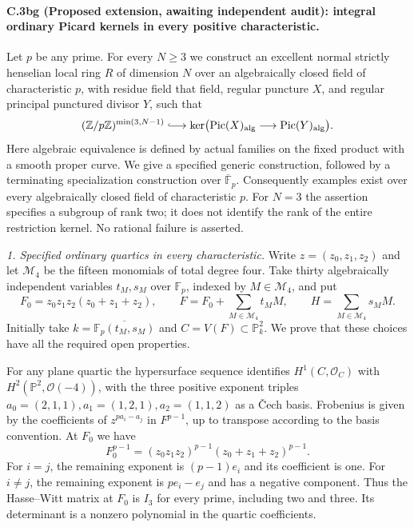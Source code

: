 \paragraph{C.3bg (Proposed extension, awaiting independent audit): integral ordinary Picard kernels in every positive characteristic.}
Let $p$ be any prime. For every $N\ge3$ we construct an excellent
normal strictly henselian local ring $R$ of dimension $N$ over an
algebraically closed field of characteristic $p$, with residue field
that field, regular puncture $X$, and regular principal punctured
divisor $Y$, such that
\[
 (\mathbb Z/p\mathbb Z)^{\min(3,N-1)}
 \lhook\joinrel\longrightarrow
 \ker\bigl(\operatorname{Pic}(X)_{\rm alg}
             \longrightarrow\operatorname{Pic}(Y)_{\rm alg}\bigr).
\]
Here algebraic equivalence is defined by actual families on the fixed
product with a smooth proper curve. We give a specified generic
construction, followed by a terminating specialization construction
over $\overline{\mathbb F}_p$. Consequently examples exist over every
algebraically closed field of characteristic $p$. For $N=3$ the
assertion specifies a subgroup of rank two; it does not identify the
rank of the entire restriction kernel. No rational failure is asserted.

\emph{1. Specified ordinary quartics in every characteristic.}
Write $z=(z_0,z_1,z_2)$ and let $\mathcal M_4$ be the fifteen monomials
of total degree four. Take thirty algebraically independent variables
$t_M,s_M$ over $\mathbb F_p$, indexed by $M\in\mathcal M_4$, and put
\[
 F_0=z_0z_1z_2(z_0+z_1+z_2),\qquad
 F=F_0+\sum_{M\in\mathcal M_4}t_M M,
 \qquad H=\sum_{M\in\mathcal M_4}s_M M.
\]
Initially take $k=\overline{\mathbb F_p(t_M,s_M)}$ and
$C=V(F)\subset\mathbb P^2_k$.
We prove that these choices have all the required open properties.

For any plane quartic the hypersurface sequence identifies
$H^1(C,\mathcal O_C)$ with
$H^2(\mathbb P^2,\mathcal O(-4))$, with the three positive exponent
triples $a_0=(2,1,1),a_1=(1,2,1),a_2=(1,1,2)$ as a \v{C}ech basis.
Frobenius is given by the coefficients of $z^{pa_i-a_j}$ in
$F^{p-1}$, up to transpose according to the basis convention.
At $F_0$ we have
\[
 F_0^{p-1}=(z_0z_1z_2)^{p-1}(z_0+z_1+z_2)^{p-1}.
\]
For $i=j$, the remaining exponent is $(p-1)e_i$ and its coefficient
is one. For $i\ne j$, the remaining exponent is $pe_i-e_j$ and has
a negative component. Thus the Hasse--Witt matrix at $F_0$ is $I_3$
for every prime, including two and three. Its determinant is a
nonzero polynomial in the quartic coefficients.

